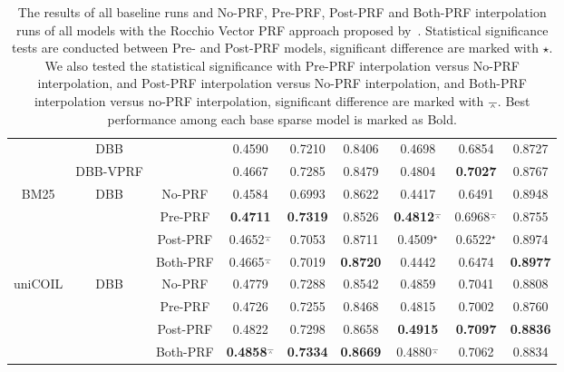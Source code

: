 \begin{table*}[]
{\begin{tabular}{ccc|ccc|ccc}
			\midrule\midrule
			&DBB&                     &        0.4590        &      0.7210      &        0.8406        &            0.4698             &        0.6854        &                0.8727                 \\
			&DBB-VPRF&                 &        0.4667        &      0.7285      &        0.8479        &            0.4804             &   \textbf{0.7027}    &                0.8767                 \\ \midrule
			\multirow{4}{*}{{BM25}}&\multirow{4}{*}{{DBB}}&No-PRF                &        0.4584        &      0.6993      &        0.8622        &            0.4417             &        0.6491        &                0.8948                 \\
			&&Pre-PRF          &   \textbf{0.4711}    & \textbf{0.7319}  &        0.8526        & \textbf{0.4812}${^\barwedge}$ & 0.6968${^\barwedge}$ &                0.8755                 \\
			&&Post-PRF          & 0.4652${^\barwedge}$ &      0.7053      &        0.8711        &       0.4509${^\star}$        &   0.6522${^\star}$   &                0.8974                 \\
			&&Both-PRF   &        0.4665${^\barwedge}$        &      0.7019      &   \textbf{0.8720}    &            0.4442             &        0.6474        &            \textbf{0.8977}            \\  \midrule

			\multirow{4}{*}{{uniCOIL}}&\multirow{4}{*}{{DBB}}& No-PRF&0.4779 & 0.7288 & 0.8542 & 0.4859 & 0.7041 & 0.8808    \\
			&&Pre-PRF &   0.4726&0.7255&0.8468&0.4815&0.7002&0.8760   \\
			&&Post-PRF& 0.4822 & 0.7298 & 0.8658 & \textbf{0.4915} & \textbf{0.7097} & \textbf{0.8836}   \\
			&&Both-PRF   & \textbf{0.4858}${^\barwedge}$ & \textbf{0.7334} & \textbf{0.8669} & 0.4880${^\barwedge}$ & 0.7062 & 0.8834 \\\midrule
			\bottomrule
		\end{tabular}
	}
\vspace{6pt}
	\caption{The results of all baseline runs and No-PRF, Pre-PRF, Post-PRF and Both-PRF interpolation runs of all models with the Rocchio Vector PRF approach proposed by~\citet{li2021pseudo}. Statistical significance tests are conducted between Pre- and Post-PRF models, significant difference are marked with $\star$. We also tested the statistical significance with Pre-PRF interpolation versus No-PRF interpolation, and Post-PRF interpolation versus No-PRF interpolation, and Both-PRF interpolation versus no-PRF interpolation, significant difference are marked with $\barwedge$. Best performance among each base sparse model is marked as Bold.}
	\label{tab:rq12}
	\vspace*{-15pt}
\end{table*}



